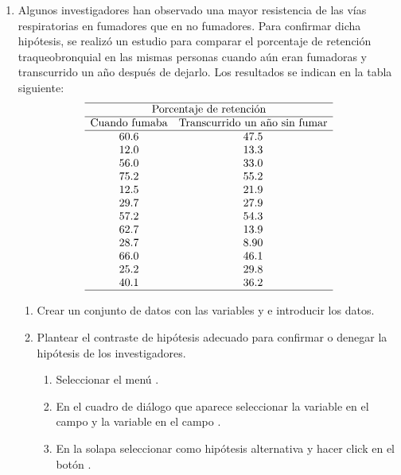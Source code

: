 \begin{enumerate}[leftmargin=*]
\item Algunos investigadores han observado una mayor resistencia de las vías respiratorias en fumadores que en no
fumadores.
Para confirmar dicha hipótesis, se realizó un estudio para comparar el porcentaje de retención traqueobronquial en las
mismas personas cuando aún eran fumadoras y transcurrido un año después de dejarlo.
Los resultados se indican en la tabla siguiente:
\[
\begin{array}{cc}
\hline
\multicolumn{2}{c}{\text{Porcentaje de retención}} \\
\hline
\text{Cuando fumaba} & \text{Transcurrido un año sin fumar} \\
\hline
60.6 & 47.5 \\
12.0 & 13.3 \\
56.0 & 33.0 \\
75.2 & 55.2 \\
12.5 & 21.9 \\
29.7 & 27.9 \\
57.2 & 54.3 \\
62.7 & 13.9 \\
28.7 & 8.90 \\
66.0 & 46.1 \\
25.2 & 29.8 \\
40.1 & 36.2 \\
\hline
\end{array}
\]

\begin{enumerate}
\item Crear un conjunto de datos con las variables  y  e introducir los datos.

\item Plantear el contraste de hipótesis adecuado para confirmar o denegar la hipótesis de los investigadores. 
\begin{indicacion}{
\begin{enumerate}
\item Seleccionar el menú .
\item En el cuadro de diálogo que aparece seleccionar la variable  en el campo  y la variable
 en el campo .
\item En la solapa  seleccionar como hipótesis alternativa  y hacer
click en el botón .
\end{enumerate}
}
\end{indicacion}
\end{enumerate}



\end{enumerate}
